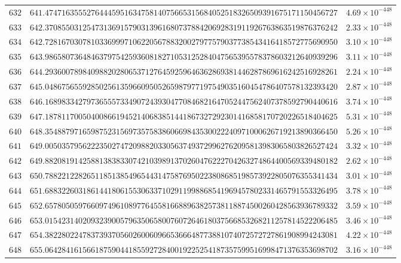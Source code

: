 \documentclass[12pt,reqno]{amsart}
\theoremstyle{remark}
\begin{document}
\begin{longtable}{clc}
$632$ & $641.4747163555276444595163475814075665315684052518326509391675171150456727$ & $4.69\times 10^{-448}$ \\
$633$ & $642.3708550312547313691579031396168073788420692831911926763863519876376242$ & $2.33\times 10^{-448}$ \\
$634$ & $642.7281670307810336999710622056788320027977579037738543416418572775690950$ & $3.10\times 10^{-448}$ \\
$635$ & $643.9865807364846379754259360818271053125284047565395578378603212640939296$ & $3.11\times 10^{-448}$ \\
$636$ & $644.2936007898409882028065371276459259646362869381446287869616242516928261$ & $2.24\times 10^{-448}$ \\
$637$ & $645.0486756559285025613596609505265987977197549035160454786407578132393420$ & $2.87\times 10^{-448}$ \\
$638$ & $646.1689833427973655573349072439304770846821647052447562407378592790440616$ & $3.74\times 10^{-448}$ \\
$639$ & $647.1878117005040086619452140683851441867327292301416858170720226518404625$ & $5.31\times 10^{-448}$ \\
$640$ & $648.3548879716598752315697357583860669843530022240971000626719213890366450$ & $5.26\times 10^{-448}$ \\
$641$ & $649.0050357956222350274720988203305637493729962762095813983065803826527424$ & $3.32\times 10^{-448}$ \\
$642$ & $649.8820819142588138383307421039891370260476222704263274864400569339480182$ & $2.62\times 10^{-448}$ \\
$643$ & $650.7882212282651185138549654431475876950223808685198573922805076355341434$ & $3.01\times 10^{-448}$ \\
$644$ & $651.6883226031861441806155306337102911998868541969457802331465791553326495$ & $3.78\times 10^{-448}$ \\
$645$ & $652.6578050597660974961089776455816688963825738118874500260428563936789332$ & $3.59\times 10^{-448}$ \\
$646$ & $653.0154231402093239005796350658007607264618037566853268211257814522206485$ & $3.46\times 10^{-448}$ \\
$647$ & $654.3822802247837393705602600609665366648773881074072572727861908994243081$ & $4.22\times 10^{-448}$ \\
$648$ & $655.0642841615661875904418559272840019225254187357599516998471376353698702$ & $3.16\times 10^{-448}$ \\

\end{longtable}
\end{document}
